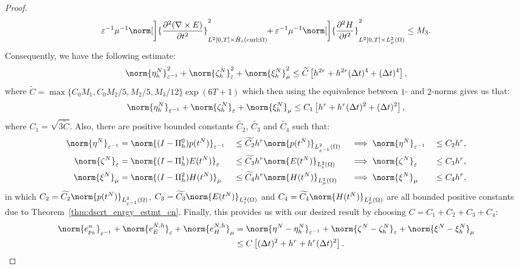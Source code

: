 \documentclass{amsart}
\theoremstyle{thmstyleone}%
\theoremstyle{thmstyletwo}%
\theoremstyle{thmstylethree}%
\DeclareMathOperator{\curl}{curl}
\begin{document}
\begin{proof}
\begin{multline*}
\varepsilon^{-1} \mu^{-1} \norm[\bigg]{\dfrac{\partial^2 (\nabla \times E)}{\partial t^2}}^2_{L^2[0, T] \times \mathring{H}_\varepsilon(\curl; \Omega)} \!\! + \varepsilon^{-1} \mu^{-1} \norm[\bigg]{\dfrac{\partial^2 H}{\partial t^2}}^2_{L^2[0, T] \times L^2_\mu(\Omega)} \leq M_3.
\end{multline*}
Consequently, we have the following estimate:
\[
  \norm{\eta_h^N}^2_{\varepsilon^{-1}} + \norm{\zeta_h^N}^2_{\varepsilon} + \norm{\xi_h^N}^2_{\mu} \le \widetilde{C} \left[h^{2 r} + h^{2 r} (\Delta t)^4 + (\Delta t)^4 \right],
\]
where $\widetilde{C} = \max\{C_0 M_1, C_0 M_2/5, M_2/5, M_3/12 \} \exp(6 T +1)$ which then using the equivalence between $1$- and $2$-norms gives us that:
\[
  \norm{\eta_h^N}_{\varepsilon^{-1}} + \norm{\zeta_h^N}_{\varepsilon} + \norm{\xi_h^N}_{\mu} \le C_1 \left[h^{r} + h^r (\Delta t)^2 + (\Delta t)^2 \right],
\]
where $C_1 = \sqrt{3 \widetilde{C}}$. Also, there are positive bounded constants $\widetilde{C_2}$, $\widetilde{C_3}$ and $\widetilde{C_4}$ such that:
\begin{alignat*}{4}
  \norm{\eta^N}_{\varepsilon^{-1}} &= \norm{(I - \Pi_h^0) p(t^N)}_{\varepsilon^{-1}} &&\le \widetilde{C_2} h^r \norm{p(t^N)}_{L^2_{\varepsilon^{-1}}(\Omega)} &&\implies \norm{\eta^N}_{\varepsilon^{-1}} &&\le C_2 h^r, \\
  \norm{\zeta^N}_{\varepsilon} &= \norm{(I - \Pi_h^1) E(t^N)}_{\varepsilon} &&\le \widetilde{C_3} h^r \norm{E(t^N)}_{L^2_{\varepsilon}(\Omega)} &&\implies \norm{\zeta^N}_{\varepsilon} &&\le C_3 h^r, \\
  \norm{\xi^N}_\mu &= \norm{(I - \Pi_h^2) H(t^N)}_\mu &&\le \widetilde{C_4} h^r \norm{H(t^N)}_{L^2_{\mu}(\Omega)} &&\implies \norm{\xi^N}_\mu &&\le C_4 h^r,
\end{alignat*}
in which $C_2 = \widetilde{C_2} \norm{p(t^N)}_{L^2_{\varepsilon^{-1}}(\Omega)}$, $C_3 = \widetilde{C_3} \norm{E(t^N)}_{L^2_{\varepsilon}(\Omega)}$ and $C_4 = \widetilde{C_4} \norm{H(t^N)}_{L^2_{\mu}(\Omega)}$ are all bounded positive constants due to Theorem~\ref{thm:dscrt_enrgy_estmt_cn}. Finally, this provides us with our desired result by choosing $C = C_1 + C_2 + C_3 + C_4$:
\begin{align*}
  \norm{e_{p_h}^n}_{\varepsilon^{-1}} + \norm{e_E^{N,h}}_{\varepsilon} + \norm{e_H^{N,h}}_{\mu} &= \norm{\eta^N - \eta^N_h}_{\varepsilon^{-1}} + \norm{\zeta^N - \zeta^N_h}_{\varepsilon} + \norm{\xi^N - \xi^N_h}_\mu \\
&\le C \left[(\Delta t)^2 + h^r + h^r (\Delta t)^2 \right]. \qedhere
\end{align*}
\end{proof}
\end{document}
